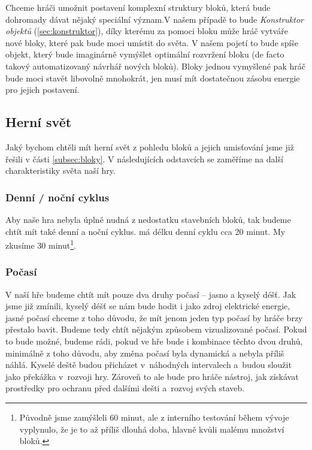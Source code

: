 Chceme hráči umožnit postavení komplexní struktury bloků, která bude dohromady dávat nějaký speciální význam.V našem případě to bude \textit{Konstruktor objektů} (\ref{sec:konstruktor}), díky kterému za pomoci bloku  může hráč vytváře nové bloky, které pak bude moci umístit do světa. V našem pojetí to bude spíše objekt, který bude imaginárně vymýšlet optimální rozvržení bloku (de facto takový automatizovaný návrhář nových bloků). Bloky jednou vymyšlené pak hráč bude moci stavět libovolně mnohokrát, jen musí mít dostatečnou zásobu energie pro jejich postavení.

\subsection{Herní svět}

Jaký bychom chtěli mít herní svět z pohledu bloků a jejich umisťování jsme již řešili v části \ref{subsec:bloky}. V následujících odstavcích se zaměříme na další charakteristiky světa naší hry.

\subsubsection{Denní / noční cyklus}
Aby naše hra nebyla úplně nudná z nedostatku stavebních bloků, tak budeme chtít mít také denní a noční cyklus. \MC{} má délku denní cyklu cca 20 minut. My zkusíme 30 minut\footnote{Původně jsme zamýšleli 60 minut, ale z interního testování během vývoje vyplynulo, že je to až příliš dlouhá doba, hlavně kvůli malému množství bloků.}.

\subsubsection{Počasí}

V naší hře budeme chtít mít pouze dva druhy počasí -- jasno a kyselý déšť. Jak jsme již zmínili, kyselý déšť se nám bude hodit i jako zdroj elektrické energie, jasné počasí chceme z toho důvodu, že mít jenom jeden typ počasí by hráče brzy přestalo bavit. Budeme tedy chtít nějakým způsobem vizualizované počasí. Pokud to bude možné, budeme rádi, pokud ve hře bude i kombinace těchto dvou druhů, minimálně z toho důvodu, aby změna počasí byla dynamická a nebyla příliš náhlá. Kyselé deště budou přicházet v~náhodných intervalech a~budou sloužit jako překážka v~rozvoji hry. Zároveň to ale bude pro hráče nástroj, jak získávat prostředky pro ochranu před dalšími dešti a~rozvoj svých staveb. 

